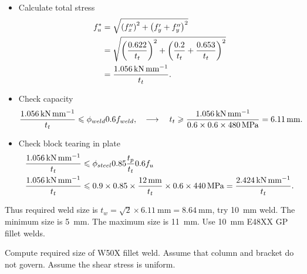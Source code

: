 \begin{solution}
\begin{itemize}
\item Calculate total stress
\begin{align*}
f_{u}^*&=\sqrt{\left(f''_x\right)^2+\left(f'_y+f''_y\right)^2}\\
&=\sqrt{\left(\dfrac{0.622}{t_t}\right)^2+\left(\dfrac{0.2}{t_t}+\dfrac{0.653}{t_t}\right)^2}\\
&=\dfrac{\SI{1.056}{\kilo\newton\per\milli\meter}}{t_t}.
\end{align*}
\item Check capacity
\begin{gather*}
\dfrac{\SI{1.056}{\kilo\newton\per\milli\meter}}{t_t}\leqslant\phi_{weld}0.6f_{weld},\quad\longrightarrow\quad
t_t\geqslant\dfrac{\SI{1.056}{\kilo\newton\per\milli\meter}}{0.6\times0.6\times\SI{480}{\mega\pascal}}=\SI{6.11}{\milli\meter}.
\end{gather*}
\item Check block tearing in plate
\begin{align*}
\dfrac{\SI{1.056}{\kilo\newton\per\milli\meter}}{t_t}&\leqslant\phi_{steel}0.85\dfrac{t_p}{t_t}0.6f_u\\
\dfrac{\SI{1.056}{\kilo\newton\per\milli\meter}}{t_t}&\leqslant0.9\times0.85\times\dfrac{\SI{12}{\milli\meter}}{t_t}\times0.6\times\SI{440}{\mega\pascal}=\dfrac{\SI{2.424}{\kilo\newton\per\milli\meter}}{t_t}.
\end{align*}
\end{itemize}
Thus required weld size is $t_w=\sqrt{2}\times\SI{6.11}{\mm}=\SI{8.64}{\mm}$, try \SI{10}{\mm} weld.
The minimum size is \SI{5}{\mm}.
The maximum size is \SI{11}{\mm}.
Use \SI{10}{\mm} E48XX GP fillet welds.
\end{solution}
\begin{exmp}
Compute required size of W50X fillet weld.
Assume that column and bracket do not govern.
Assume the shear stress is uniform.
\begin{figure}[H]

\end{figure}
\end{exmp}
